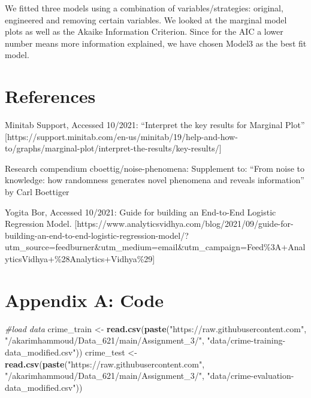 \documentclass[3p]{elsarticle} %
\newenvironment{Shaded}{\begin{snugshade}}{\end{snugshade}}
\newcommand{\CommentTok}[1]{\textcolor[rgb]{0.56,0.35,0.01}{\textit{#1}}}
\newcommand{\KeywordTok}[1]{\textcolor[rgb]{0.13,0.29,0.53}{\textbf{#1}}}
\newcommand{\NormalTok}[1]{#1}
\newcommand{\StringTok}[1]{\textcolor[rgb]{0.31,0.60,0.02}{#1}}
\begin{document}
We fitted three models using a combination of variables/strategies:
original, engineered and removing certain variables. We looked at the
marginal model plots as well as the Akaike Information Criterion. Since
for the AIC a lower number means more information explained, we have
chosen Model3 as the best fit model.

\newpage

\hypertarget{references}{%
\section{References}\label{references}}

Minitab Support, Accessed 10/2021: ``Interpret the key results for
Marginal Plot''
{[}https://support.minitab.com/en-us/minitab/19/help-and-how-to/graphs/marginal-plot/interpret-the-results/key-results/{]}

Research compendium cboettig/noise-phenomena: Supplement to: ``From
noise to knowledge: how randomness generates novel phenomena and reveals
information'' by Carl Boettiger

Yogita Bor, Accessed 10/2021: Guide for building an End-to-End Logistic
Regression Model.
{[}https://www.analyticsvidhya.com/blog/2021/09/guide-for-building-an-end-to-end-logistic-regression-model/?utm\_source=feedburner\&utm\_medium=email\&utm\_campaign=Feed\%3A+AnalyticsVidhya+\%28Analytics+Vidhya\%29{]}

\newpage

\hypertarget{appendix-a-code}{%
\section{Appendix A: Code}\label{appendix-a-code}}

\begin{Shaded}
\begin{Highlighting}[]
\CommentTok{#load data}
\NormalTok{crime_train <-}\StringTok{ }\KeywordTok{read.csv}\NormalTok{(}\KeywordTok{paste}\NormalTok{(}\StringTok{"https://raw.githubusercontent.com"}\NormalTok{,}
                      \StringTok{"/akarimhammoud/Data_621/main/Assignment_3/"}\NormalTok{,}
                      \StringTok{"data/crime-training-data_modified.csv"}\NormalTok{))}
\NormalTok{crime_test <-}\StringTok{ }\KeywordTok{read.csv}\NormalTok{(}\KeywordTok{paste}\NormalTok{(}\StringTok{"https://raw.githubusercontent.com"}\NormalTok{,}
                       \StringTok{"/akarimhammoud/Data_621/main/Assignment_3/"}\NormalTok{,}
                       \StringTok{"data/crime-evaluation-data_modified.csv"}\NormalTok{))}
\end{Highlighting}
\end{Shaded}
\end{document}
